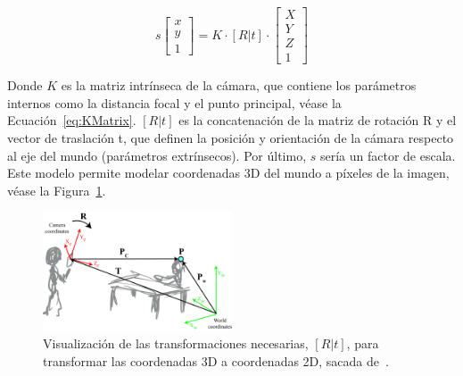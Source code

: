 \begin{equation}\label{eq:ProyectionFormula}
    s\begin{bmatrix}x\\y\\1\end{bmatrix} = K\cdot\left[R|t\right]\cdot\begin{bmatrix}X\\Y\\Z\\1\end{bmatrix}
\end{equation}

Donde $K$ es la matriz intrínseca de la cámara, que contiene los parámetros internos como la distancia focal y el 
punto principal, véase la Ecuación~\ref{eq:KMatrix}. $[R|t]$ es la concatenación de la matriz de rotación R y
el vector de traslación t, que definen la posición y orientación de la cámara respecto al eje del mundo (parámetros extrínsecos).
Por último, $s$ sería un factor de escala. Este modelo permite modelar coordenadas 3D del mundo a píxeles de la imagen, véase la 
Figura~\ref{fig:WorldToImageCoordinates}. 

\begin{figure}[!ht]
\begin{center}
    \includegraphics[width=0.5\textwidth]{imagenes/chapter2/world_and_camera_coordinates}
\end{center}
\caption{Visualización de las transformaciones necesarias, $[R|t]$, para transformar las coordenadas 3D a coordenadas 2D, sacada de~\cite{VisionBookMIT}.}
\label{fig:WorldToImageCoordinates}
\end{figure}

